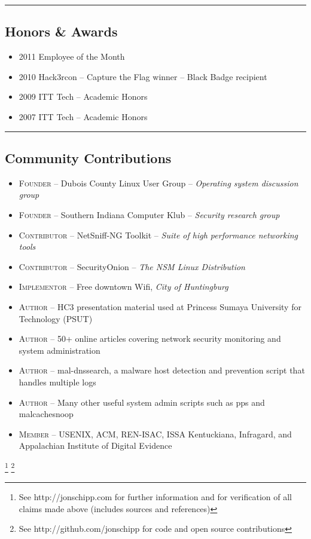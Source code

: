 \documentclass[10pt,letterpaper]{article}
\begin{document}
\hrule
\vspace{-0.4em}
\subsection*{Honors \& Awards}

\begin{itemize}
	\parskip=0.1em

	\item \textsc{2011} Employee of the Month
	\item \textsc{2010} Hack3rcon – Capture the Flag winner – Black Badge recipient
	\item \textsc{2009} ITT Tech – Academic Honors
	\item \textsc{2007} ITT Tech – Academic Honors

\end{itemize}

\hrule
\vspace{-0.4em}
\subsection*{Community Contributions}

\begin{itemize}
	\parskip=0.1em

	\item \textsc{Founder} -- Dubois County Linux User Group – \textit{Operating system discussion group}
	\item \textsc{Founder} -- Southern Indiana Computer Klub – \textit{Security research group}
	\item \textsc{Contributor} -- NetSniff-NG Toolkit – \textit{Suite of high performance networking tools}
	\item \textsc{Contributor} -- SecurityOnion – \textit{The NSM Linux Distribution}
	\item \textsc{Implementor} -- Free downtown Wifi, \textit{City of Huntingburg}
	\item \textsc{Author} -- HC3 presentation material used at Princess Sumaya University for Technology (PSUT)
	\item \textsc{Author} -- 50+ online articles covering network security monitoring and system administration
	\item \textsc{Author} -- mal-dnssearch, a malware host detection and prevention script that handles multiple logs
	\item \textsc{Author} -- Many other useful system admin scripts such as pps and malcachesnoop
	\item \textsc{Member} -- USENIX, ACM, REN-ISAC, ISSA Kentuckiana, Infragard, and Appalachian Institute of Digital Evidence

\end{itemize}

\let\thefootnote\relax\footnote{See http://jonschipp.com for further
information and for verification of all claims made above (includes sources and references)}
\let\thefootnote\relax\footnote{See http://github.com/jonschipp for code and open source contributions}
\end{document}
